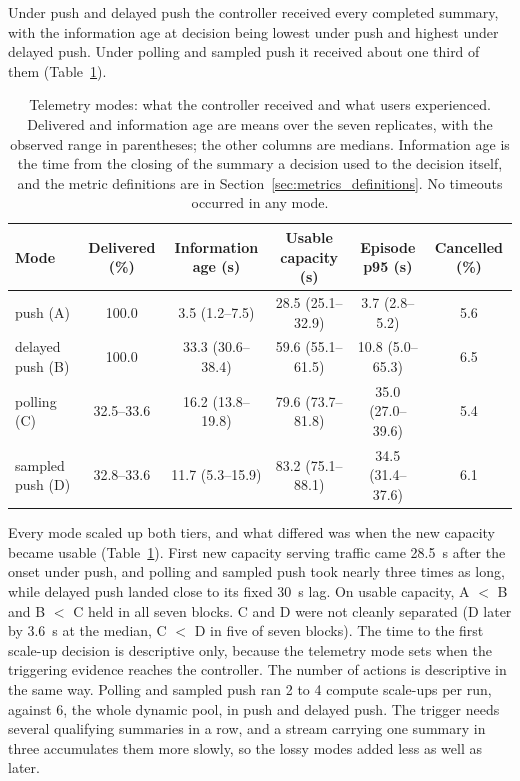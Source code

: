 ﻿\documentclass[12pt,reqno,twoside]{amsbook}
\begin{document}
Under push and delayed push the controller received every completed
summary, with the information age at decision being lowest under push and
highest under delayed push. Under polling and sampled push it received about
one third of them (Table~\ref{tab:rq1_arms}).

\begin{table}[htbp]
    \centering
    \caption{Telemetry modes: what the controller received and what users
    experienced. Delivered and information age are means over the seven
    replicates, with the observed range in parentheses; the other columns are
    medians. Information age is the time from the closing of the summary a
    decision used to the decision itself, and the metric definitions are in
    Section~\ref{sec:metrics_definitions}. No timeouts occurred in any mode.}
    \label{tab:rq1_arms}
    \footnotesize
    \setlength{\tabcolsep}{2pt}
    \begin{tabular}{l c c c c c}
        \toprule
        Mode & Delivered (\%) & Information age (s) & Usable capacity (s) & Episode p95 (s) & Cancelled (\%) \\
        \midrule
        push (A) & 100.0 & 3.5 (1.2--7.5) & 28.5 (25.1--32.9) & 3.7 (2.8--5.2) & 5.6 \\
        delayed push (B) & 100.0 & 33.3 (30.6--38.4) & 59.6 (55.1--61.5) & 10.8 (5.0--65.3) & 6.5 \\
        polling (C) & 32.5--33.6 & 16.2 (13.8--19.8) & 79.6 (73.7--81.8) & 35.0 (27.0--39.6) & 5.4 \\
        sampled push (D) & 32.8--33.6 & 11.7 (5.3--15.9) & 83.2 (75.1--88.1) & 34.5 (31.4--37.6) & 6.1 \\
        \bottomrule
    \end{tabular}
\end{table}

Every mode scaled up both tiers, and what differed was when the new
capacity became usable (Table~\ref{tab:rq1_arms}). First new capacity serving
traffic came 28.5~s after the onset under push, and polling and sampled push
took nearly three times as long, while delayed push landed close to its fixed
30~s lag. On usable capacity, A $<$ B and B $<$ C held in
all seven blocks. C and D were not cleanly separated (D later by 3.6~s at the
median, C $<$ D in five of seven blocks). The time to the first scale-up
decision is descriptive only, because the telemetry mode sets when the
triggering evidence reaches the controller. The number of actions is
descriptive in the same way. Polling and sampled push ran 2 to 4 compute
scale-ups per run, against 6, the whole dynamic pool, in push and delayed push.
The trigger needs several qualifying summaries in a row, and a stream carrying one
summary in three accumulates them more slowly, so the lossy modes added
less as well as later.
\end{document}

